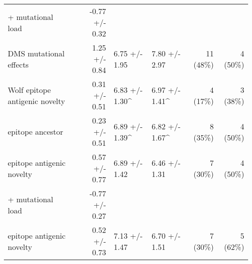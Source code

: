 \begin{tabular*}{1.1\textwidth}{lrllrr}
\hspace{5mm} + mutational load & -0.77 +/- 0.32 & & & & \\
DMS mutational effects & 1.25 +/- 0.84 & 6.75 +/- 1.95 & 7.80 +/- 2.97 & 11 (48\%) & 4 (50\%) \\
Wolf epitope antigenic novelty & 0.31 +/- 0.51 & 6.83 +/- 1.30\^ & 6.97 +/- 1.41\^ & 4 (17\%) & 3 (38\%) \\
epitope ancestor & 0.23 +/- 0.51 & 6.89 +/- 1.39\^ & 6.82 +/- 1.67\^ & 8 (35\%) & 4 (50\%) \\
epitope antigenic novelty & 0.57 +/- 0.77 & 6.89 +/- 1.42 & 6.46 +/- 1.31 & 7 (30\%) & 4 (50\%) \\
\hspace{5mm} + mutational load & -0.77 +/- 0.27 & & & & \\
epitope antigenic novelty & 0.52 +/- 0.73 & 7.13 +/- 1.47 & 6.70 +/- 1.51 & 7 (30\%) & 5 (62\%) \\

\bottomrule
\end{tabular*}
